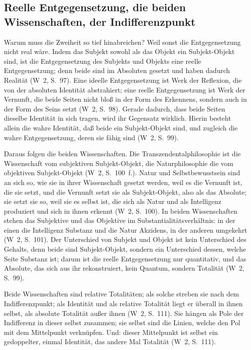 \documentclass[11pt,a4paper]{article}
\newcommand{\SO}{Subjekt-Objekt}
\newcommand{\Werke}[1]{(W~2, S.~#1)}
\begin{document}
\subsection{Reelle Entgegensetzung, die beiden Wissenschaften, der Indifferenzpunkt}

Warum muss die Zweiheit so tief hinabreichen? Weil sonst die Entgegensetzung nicht real wäre. \glqq Indem das Subjekt sowohl als das Objekt ein \SO{} sind, ist die Entgegensetzung des Subjekts und Objekts eine reelle Entgegensetzung; denn beide sind im Absoluten gesetzt und haben dadurch Realität\grqq{} \Werke{97}. Eine ideelle Entgegensetzung ist Werk der Reflexion, die von der absoluten Identität abstrahiert; eine reelle Entgegensetzung ist Werk der Vernunft, die beide Seiten \glqq nicht bloß in der Form des Erkennens, sondern auch in der Form des Seins\grqq{} setzt \Werke{98}. Gerade dadurch, dass beide Seiten dieselbe Identität in sich tragen, wird ihr Gegensatz wirklich. \glqq Hierin besteht allein die wahre Identität, daß beide ein \SO{} sind, und zugleich die wahre Entgegensetzung, deren sie fähig sind\grqq{} \Werke{99}.

Daraus folgen die beiden Wissenschaften. Die Transzendentalphilosophie ist die Wissenschaft vom subjektiven \SO{}, die Naturphilosophie die vom objektiven \SO{} \Werke{100~f.}. Natur und Selbstbewusstsein sind an sich so, wie sie in ihrer Wissenschaft gesetzt werden, \glqq weil es die Vernunft ist, die sie setzt, und die Vernunft setzt sie als \SO{}, also als das Absolute\grqq{}; sie setzt sie so, \glqq weil sie es selbst ist, die sich als Natur und als Intelligenz produziert und sich in ihnen erkennt\grqq{} \Werke{100}. In beiden Wissenschaften stehen das Subjektive und das Objektive im Substantialitätsverhältnis: in der einen die Intelligenz Substanz und die Natur Akzidens, in der anderen umgekehrt \Werke{101}. Der Unterschied von Subjekt und Objekt ist kein Unterschied des Gehalts, denn beide sind \SO{}, sondern ein Unterschied dessen, welche Seite Substanz ist; darum ist die reelle Entgegensetzung \glqq nur quantitativ\grqq{}, und das Absolute, das sich aus ihr rekonstruiert, \glqq kein Quantum, sondern Totalität\grqq{} \Werke{99}.

Beide Wissenschaften sind relative Totalitäten; als solche \glqq streben sie nach dem Indifferenzpunkt; als Identität und als relative Totalität liegt er überall in ihnen selbst, als absolute Totalität außer ihnen\grqq{} \Werke{111}. Sie hängen \glqq als Pole der Indifferenz in dieser selbst zusammen; sie selbst sind die Linien, welche den Pol mit dem Mittelpunkt verknüpfen\grqq{}. Und: \glqq dieser Mittelpunkt ist selbst ein gedoppelter, einmal Identität, das andere Mal Totalität\grqq{} \Werke{111}.
\end{document}
